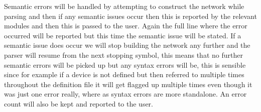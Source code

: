 \documentclass[10pt]{article}
\begin{document}
Semantic errors will be handled by attempting to construct the network while parsing and then if any semantic issues occur then this is reported by the relevant modules and then this is passed to the user. Again the full line where the error occurred will be reported but this time the semantic issue will be stated. If a semantic issue does occur we will stop building the network any further and the parser will resume from the next stopping symbol, this means that no further semantic errors will be picked up but any syntax errors will be, this is sensible since for example if a device is not defined but then referred to multiple times throughout the definition file it will get flagged up multiple times even though it was just one error really, where as syntax errors are more standalone. An error count will also be kept and reported to the user.
\end{document}
